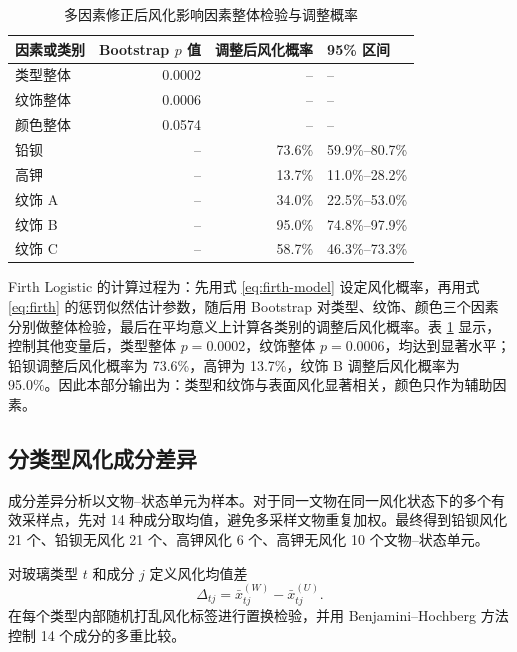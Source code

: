 \documentclass[UTF8,zihao=-4,a4paper,fontset=fandol]{ctexart}
\begin{document}
\begin{table}[H]
  \centering
  \caption{多因素修正后风化影响因素整体检验与调整概率}
  \label{tab:q1-firth}
  \begin{tabular}{lrrl}
    \toprule
    因素或类别 & Bootstrap $p$ 值 & 调整后风化概率 & 95\% 区间 \\
    \midrule
    类型整体 & 0.0002 & -- & -- \\
    纹饰整体 & 0.0006 & -- & -- \\
    颜色整体 & 0.0574 & -- & -- \\
    铅钡 & -- & 73.6\% & 59.9\%--80.7\% \\
    高钾 & -- & 13.7\% & 11.0\%--28.2\% \\
    纹饰 A & -- & 34.0\% & 22.5\%--53.0\% \\
    纹饰 B & -- & 95.0\% & 74.8\%--97.9\% \\
    纹饰 C & -- & 58.7\% & 46.3\%--73.3\% \\
    \bottomrule
  \end{tabular}
\end{table}

Firth Logistic 的计算过程为：先用式 \eqref{eq:firth-model} 设定风化概率，再用式 \eqref{eq:firth} 的惩罚似然估计参数，随后用 Bootstrap 对类型、纹饰、颜色三个因素分别做整体检验，最后在平均意义上计算各类别的调整后风化概率。表 \ref{tab:q1-firth} 显示，控制其他变量后，类型整体 $p=0.0002$，纹饰整体 $p=0.0006$，均达到显著水平；铅钡调整后风化概率为 73.6\%，高钾为 13.7\%，纹饰 B 调整后风化概率为 95.0\%。因此本部分输出为：类型和纹饰与表面风化显著相关，颜色只作为辅助因素。

\subsection{分类型风化成分差异}

成分差异分析以文物--状态单元为样本。对于同一文物在同一风化状态下的多个有效采样点，先对 14 种成分取均值，避免多采样文物重复加权。最终得到铅钡风化 21 个、铅钡无风化 21 个、高钾风化 6 个、高钾无风化 10 个文物--状态单元。

对玻璃类型 $t$ 和成分 $j$ 定义风化均值差
\begin{equation}
  \Delta_{tj}=\bar x_{tj}^{(W)}-\bar x_{tj}^{(U)}.
  \label{eq:component-diff}
\end{equation}
在每个类型内部随机打乱风化标签进行置换检验，并用 Benjamini--Hochberg 方法控制 14 个成分的多重比较。
\end{document}
